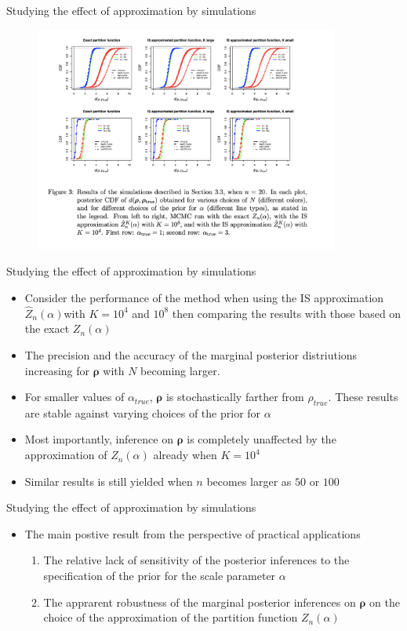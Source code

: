 \documentclass[11pt]{beamer}
\begin{document}
\begin{frame}{Studying the effect of approximation by simulations}
    \begin{figure}
        \includegraphics[width=10cm]{VitelliFigure3.png}
    \end{figure}
\end{frame}

\begin{frame}{Studying the effect of approximation by simulations}
\begin{itemize}
    \item Consider the performance of the method when using the IS approximation $\hat Z_n(\alpha)$with $K=10^4$ and $10^8$ then comparing the results with those based on the exact $Z_n(\alpha)$
    \item The precision and the accuracy of the marginal posterior distriutions increasing for $\boldsymbol{\rho}$ with $N$ becoming larger.
    \item For smaller values of $\alpha_{true}$, $\boldsymbol{\rho}$ is stochastically farther from $\rho_{true}$. These results are stable against varying choices of the prior for $\alpha$
    \item Most importantly, inference on $\boldsymbol{\rho}$ is completely unaffected by the approximation of $Z_n(\alpha)$ already when $K=10^4$
    \item Similar results is still yielded when $n$ becomes larger as $50$ or $100$
\end{itemize}
\end{frame}

\begin{frame}{Studying the effect of approximation by simulations}
\begin{itemize}
    \item The main postive result from the perspective of practical applications
    \begin{enumerate}
        \item The relative lack of sensitivity of the posterior inferences to the specification of the prior for the scale parameter $\alpha$
        \item The apprarent robustness of the marginal posterior inferences on $\boldsymbol{\rho}$ on the choice of the approximation of the partition function $Z_n(\alpha)$
    \end{enumerate}
\end{itemize}
\end{frame}
\end{document}
